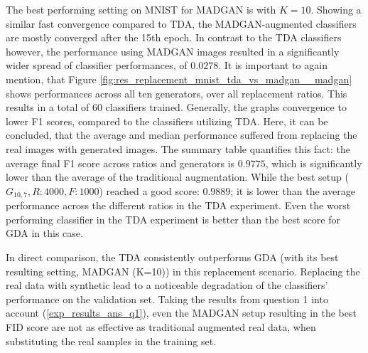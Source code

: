 The best performing setting on MNIST for MADGAN is with $K=10$. Showing a similar fast convergence compared to TDA, the MADGAN-augmented classifiers are mostly converged after the 15th epoch. In contrast to the TDA classifiers however, the performance using MADGAN images resulted in a significantly wider spread of classifier performances, of $0.0278$. It is important to again mention, that Figure \ref{fig:res_replacement_mnist_tda_vs_madgan__madgan} shows performances across all ten generators, over all replacement ratios. This results in a total of $60$ classifiers trained. Generally, the graphs convergence to lower F1 scores, compared to the classifiers utilizing TDA. Here, it can be concluded, that the average and median performance suffered from replacing the real images with generated images. The summary table quantifies this fact: the average final F1 score across ratios and generators is $0.9775$, which is significantly lower than the average of the traditional augmentation. While the best setup (\(G_{10,7}, R:4000, F:1000\)) reached a good score: $0.9889$; it is lower than the average performance across the different ratios in the TDA experiment. Even the worst performing classifier in the TDA experiment is better than the best score for GDA in this case.

In direct comparison, the TDA consistently outperforms GDA (with its best resulting setting, MADGAN (K=10)) in this replacement scenario. Replacing the real data with synthetic lead to a noticeable degradation of the classifiers' performance on the validation set. Taking the results from question 1 into account (\ref{exp_results_ans_q1}), even the MADGAN setup resulting in the best FID score are not as effective as traditional augmented real data, when substituting the real samples in the training set.

